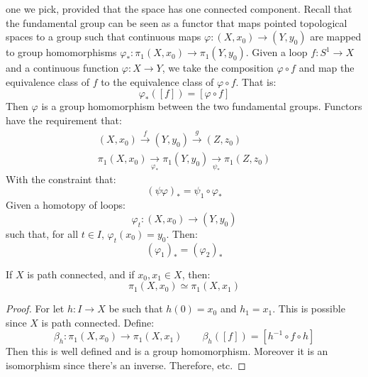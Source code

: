         one we pick, provided that the space has one connected
        component. Recall that the fundamental group can be
        seen as a functor that maps pointed topological
        spaces to a group such that continuous maps
        $\varphi:(X,x_{0})\rightarrow(Y,y_{0})$ are mapped
        to group homomorphisms
        $\varphi_{*}:\pi_{1}(X,x_{0})\rightarrow\pi_{1}(Y,y_{0})$.
        Given a loop $f:S^{1}\rightarrow{X}$ and a continuous
        function $\varphi:X\rightarrow{Y}$, we take the
        composition $\varphi\circ{f}$ and map the equivalence
        class of $f$ to the equivalence class of
        $\varphi\circ{f}$. That is:
        \begin{equation}
            \varphi_{*}([f])=[\varphi\circ{f}]
        \end{equation}
        Then $\varphi$ is a group homomorphism between the
        two fundamental groups. Functors have the requirement
        that:
        \begin{align}
            (X,x_{0})\overset{f}{\longrightarrow}
            (Y,y_{0})\overset{g}{\longrightarrow}
            (Z,z_{0})\\
            \pi_{1}(X,x_{0})
                \underset{\varphi_{*}}{\longrightarrow}
            \pi_{1}(Y,y_{0})
                \underset{\psi_{*}}{\longrightarrow}
            \pi_{1}(Z,z_{0})
        \end{align}
        With the constraint that:
        \begin{equation}
            (\psi\varphi)_{*}=\psi_{1}\circ\varphi_{*}
        \end{equation}
        Given a homotopy of loops:
        \begin{equation}
            \varphi_{t}:(X,x_{0})\rightarrow(Y,y_{0})
        \end{equation}
        such that, for all $t\in{I}$, $\varphi_{t}(x_{0})=y_{0}$.
        Then:
        \begin{equation}
            (\varphi_{1})_{*}=(\varphi_{2})_{*}
        \end{equation}
        \begin{theorem}
            If $X$ is path connected, and if $x_{0},x_{1}\in{X}$,
            then:
            \begin{equation}
                \pi_{1}(X,x_{0})\simeq\pi_{1}(X,x_{1})
            \end{equation}
        \end{theorem}
        \begin{proof}
            For let $h:I\rightarrow{X}$ be such that
            $h(0)=x_{0}$ and $h_{1}=x_{1}$. This is possible
            since $X$ is path connected. Define:
            \begin{equation}
                \beta_{h}:\pi_{1}(X,x_{0})\rightarrow
                \pi_{1}(X,x_{1})\quad\quad
                \beta_{h}([f])=[h^{\minus{1}}\circ{f}\circ{h}]
            \end{equation}
            Then this is well defined and is a group homomorphism.
            Moreover it is an isomorphism since there's an
            inverse. Therefore, etc.
        \end{proof}
